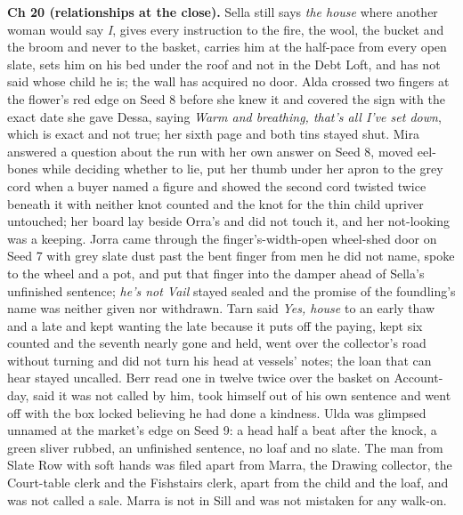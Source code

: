 \documentclass{design/chronicle}
\begin{document}
{\textbf{Ch 20 (relationships at the close).} Sella still says \emph{the house} where another woman would say \emph{I}, gives every instruction to the fire, the wool, the bucket and the broom and never to the basket, carries him at the half-pace from every open slate, sets him on his bed under the roof and not in the Debt Loft, and has not said whose child he is; the wall has acquired no door. Alda crossed two fingers at the flower’s red edge on Seed 8 before she knew it and covered the sign with the exact date she gave Dessa, saying \emph{Warm and breathing, that’s all I’ve set down}, which is exact and not true; her sixth page and both tins stayed shut. Mira answered a question about the run with her own answer on Seed 8, moved eel-bones while deciding whether to lie, put her thumb under her apron to the grey cord when a buyer named a figure and showed the second cord twisted twice beneath it with neither knot counted and the knot for the thin child upriver untouched; her board lay beside Orra’s and did not touch it, and her not-looking was a keeping. Jorra came through the finger’s-width-open wheel-shed door on Seed 7 with grey slate dust past the bent finger from men he did not name, spoke to the wheel and a pot, and put that finger into the damper ahead of Sella’s unfinished sentence; \emph{he’s not Vail} stayed sealed and the promise of the foundling’s name was neither given nor withdrawn. Tarn said \emph{Yes, house} to an early thaw and a late and kept wanting the late because it puts off the paying, kept six counted and the seventh nearly gone and held, went over the collector’s road without turning and did not turn his head at vessels’ notes; the loan that can hear stayed uncalled. Berr read one in twelve twice over the basket on Account-day, said it was not called by him, took himself out of his own sentence and went off with the box locked believing he had done a kindness. Ulda was glimpsed unnamed at the market’s edge on Seed 9: a head half a beat after the knock, a green sliver rubbed, an unfinished sentence, no loaf and no slate. The man from Slate Row with soft hands was filed apart from Marra, the Drawing collector, the Court-table clerk and the Fishstairs clerk, apart from the child and the loaf, and was not called a sale. Marra is not in Sill and was not mistaken for any walk-on.

}
\end{document}
